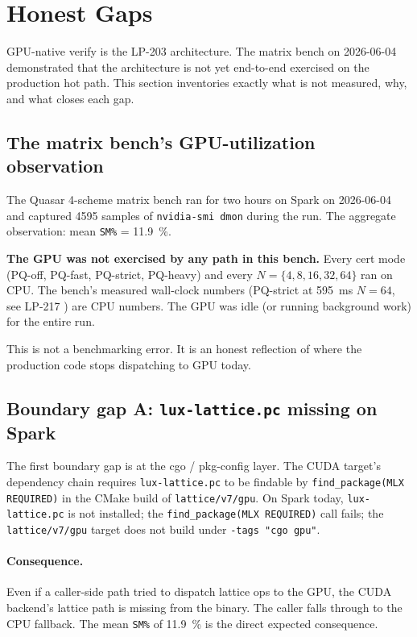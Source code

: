 \section{Honest Gaps}
\label{sec:gaps}

GPU-native verify is the LP-203 architecture. The matrix bench on
2026-06-04 demonstrated that the architecture is not yet
end-to-end exercised on the production hot path. This section
inventories exactly what is not measured, why, and what closes
each gap.

\subsection{The matrix bench's GPU-utilization observation}

The Quasar 4-scheme matrix bench \cite{matrixbench} ran for two
hours on Spark on 2026-06-04 and captured \num{4595} samples of
\texttt{nvidia-smi dmon} during the run. The aggregate
observation: mean \texttt{SM\%} = \SI{11.9}{\percent}.

\textbf{The GPU was not exercised by any path in this bench.}
Every cert mode (PQ-off, PQ-fast, PQ-strict, PQ-heavy) and every
$N{=}\{4,8,16,32,64\}$ ran on CPU. The bench's measured
wall-clock numbers (PQ-strict at \SI{595}{\milli\second}
$N{=}64$, see LP-217 \cite{lp217}) are CPU numbers. The GPU was
idle (or running background work) for the entire run.

This is not a benchmarking error. It is an honest reflection of
where the production code stops dispatching to GPU today.

\subsection{Boundary gap A: \texttt{lux-lattice.pc} missing on Spark}

The first boundary gap is at the cgo / pkg-config layer. The
CUDA target's dependency chain requires \texttt{lux-lattice.pc}
to be findable by \texttt{find\_package(MLX REQUIRED)} in the
CMake build of \texttt{lattice/v7/gpu}. On Spark today,
\texttt{lux-lattice.pc} is not installed; the
\texttt{find\_package(MLX REQUIRED)} call fails; the
\texttt{lattice/v7/gpu} target does not build under
\texttt{-tags "cgo gpu"}.

\paragraph{Consequence.} Even if a caller-side path tried to
dispatch lattice ops to the GPU, the CUDA backend's lattice path
is missing from the binary. The caller falls through to the CPU
fallback. The mean \texttt{SM\%} of \SI{11.9}{\percent} is the
direct expected consequence.

